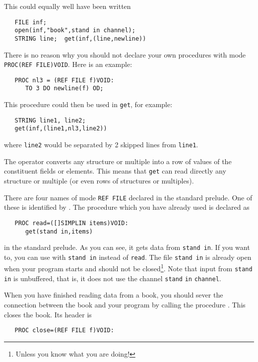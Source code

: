 \noindent
This could equally well have been written
\begin{verbatim}
   FILE inf;
   open(inf,"book",stand in channel);
   STRING line;  get(inf,(line,newline))
\end{verbatim}
\noindent
There is no reason why you should not declare your own procedures
with mode \verb|PROC(REF FILE)VOID|. Here is an example:
\begin{verbatim}
   PROC nl3 = (REF FILE f)VOID:
      TO 3 DO newline(f) OD;
\end{verbatim}
\noindent
This procedure could then be used in \verb|get|, for example:
\begin{verbatim}
   STRING line1, line2;
   get(inf,(line1,nl3,line2))
\end{verbatim}
\noindent
where \verb|line2| would be separated by 2 skipped lines from
\verb|line1|.

\hypertarget{trans-straight}{}\label{trans-straight}The  operator converts any
structure or multiple into a row of values of the constituent fields
or elements. This means that \verb|get| can read directly any
structure or multiple (or even rows of structures or multiples).

There are four names of mode \verb|REF FILE| declared in the standard
prelude. One of these is identified by . The procedure
 which you have already used is declared as
\begin{verbatim}
   PROC read=([]SIMPLIN items)VOID:
      get(stand in,items)
\end{verbatim}
\noindent
in the standard prelude. As you can see, it gets data from
\verb|stand in|. If you want to, you can use  with
\verb|stand in| instead of \verb|read|. The file \verb|stand in| is
already open when your program starts and should not be
closed\footnote{Unless you know what you are doing!}. Note that input
from \verb|stand in| is unbuffered, that is, it does not use the
channel \verb|stand| \verb|in| \verb|channel|.

When you have finished reading data from a book, you should sever the
connection between the book and your program by calling the procedure
. This closes the book. Its header is
\begin{verbatim}
   PROC close=(REF FILE f)VOID:
\end{verbatim}

